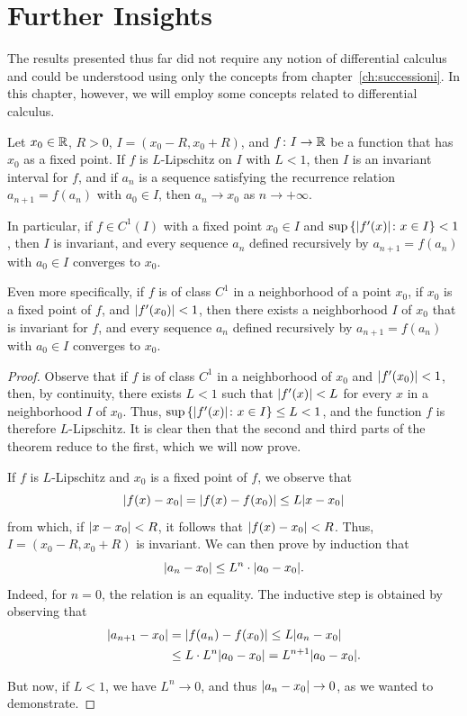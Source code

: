 \section{Further Insights}

The results presented thus far did not require any notion of differential
calculus and could be understood using only the concepts from
chapter~\ref{ch:successioni}. In this chapter, however, we will employ some
concepts related to differential calculus.

\begin{theorem}
Let $x_0\in {\mathbb R}$, $R>0$, $I=(x_0 - R, x_0+R)$, and $f\colon I \to {\mathbb R}$ be a
function that has $x_0$ as a fixed point. If $f$ is $L$-Lipschitz on $I$ with
$L<1$, then $I$ is an invariant interval for $f$, and if $a_n$ is a sequence
satisfying the recurrence relation $a_{n+1} = f(a_n)$ with $a_0 \in I$, then
$a_n \to x_0$ as $n\to +\infty$.

In particular, if $f\in C^1(I)$ with a fixed point $x_0 \in I$ and
$\sup{\left\{ {\left|f'(x)\right|}\colon x\in I \right\}} < 1$, then $I$ is invariant, and every
sequence $a_n$ defined recursively by $a_{n+1}=f(a_n)$ with $a_0 \in I$
converges to $x_0$.

Even more specifically, if $f$ is of class $C^1$ in a neighborhood of a point
$x_0$, if $x_0$ is a fixed point of $f$, and ${\left|f'(x_0)\right|}<1$, then there
exists a neighborhood $I$ of $x_0$ that is invariant for $f$, and every sequence
$a_n$ defined recursively by $a_{n+1}= f(a_n)$ with $a_0\in I$ converges to
$x_0$.
\end{theorem}
%
\begin{proof}
Observe that if $f$ is of class $C^1$ in a neighborhood of $x_0$ and
${\left|f'(x_0)\right|} < 1$, then, by continuity, there exists $L<1$ such that
${\left|f'(x)\right|} < L$ for every $x$ in a neighborhood $I$ of $x_0$. Thus,
$\sup{\left\{ {\left|f'(x)\right|}\colon x \in I \right\}} \le L < 1$, and the function $f$ is
therefore $L$-Lipschitz. It is clear then that the second and third parts of the
theorem reduce to the first, which we will now prove.

If $f$ is $L$-Lipschitz and $x_0$ is a fixed point of $f$, we observe that
\[
{\left|f(x) - x_0\right|} = {\left|f(x) - f(x_0)\right|} \le L {\left|x-x_0\right|}
\]
from which, if ${\left|x - x_0\right|} < R$, it follows that ${\left|f(x) - x_0\right|} < R$.
Thus, $I = (x_0-R, x_0+R)$ is invariant. We can then prove by induction that
\[
 {\left|a_n - x_0\right|} \le L^n \cdot {\left|a_0-x_0\right|}.
\]
Indeed, for $n=0$, the relation is an equality. The inductive step is obtained
by observing that
\begin{align*}
{\left|a_{n+1} - x_0\right|}
 &= {\left|f(a_n) - f(x_0)\right|}
 \le L {\left|a_n - x_0\right|} \\
 &\le L\cdot L^n{\left|a_0-x_0\right|}
 = L^{n+1}{\left|a_0-x_0\right|}.
\end{align*}

But now, if $L<1$, we have $L^n\to 0$, and thus ${\left|a_n -x_0\right|} \to 0$, as we
wanted to demonstrate.
\end{proof}

